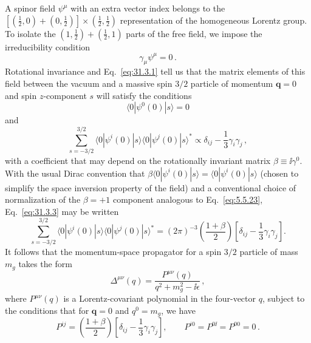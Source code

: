A spinor field \(\psi^\mu\) with an extra vector index belongs to the
\([(\frac12,0)+(0,\frac12)]\mathbin{\times}(\frac12,\frac12)\)
representation of the homogeneous Lorentz group. To isolate the
\((1,\frac12)+(\frac12,1)\) parts of the free field, we impose the
irreducibility condition
\begin{equation}
  \gamma_\mu\psi^\mu=0\,.
  \tag{31.3.1}\label{eq:31.3.1}
\end{equation}
Rotational invariance and Eq.~\eqref{eq:31.3.1} tell us that the matrix
elements of this field between the vacuum and a massive spin \(3/2\)
particle of momentum \(\boldsymbol q=0\) and spin \(z\)-component \(s\)
will satisfy the conditions
\begin{equation}
  \langle0|\psi^0(0)|s\rangle=0
  \tag{31.3.2}\label{eq:31.3.2}
\end{equation}
and
\begin{equation}
  \sum_{s=-3/2}^{3/2}
  \langle0|\psi^i(0)|s\rangle
  \langle0|\psi^j(0)|s\rangle^*
  \propto\delta_{ij}-\frac13\gamma_i\gamma_j\,,
  \tag{31.3.3}\label{eq:31.3.3}
\end{equation}
with a coefficient that may depend on the rotationally invariant matrix
\(\beta\equiv \ii\gamma^0\). With the usual Dirac convention that
\(\beta\langle0|\psi^i(0)|s\rangle=\langle0|\psi^i(0)|s\rangle\)
(chosen to simplify the space inversion property of the field) and a
conventional choice of normalization of the \(\beta=+1\) component
analogous to Eq.~\eqref{eq:5.5.23}, Eq.~\eqref{eq:31.3.3} may be written
\begin{equation}
  \sum_{s=-3/2}^{3/2}
  \langle0|\psi^i(0)|s\rangle
  \langle0|\psi^j(0)|s\rangle^*
  =(2\pi)^{-3}\left(\frac{1+\beta}{2}\right)
  \left[\delta_{ij}-\frac13\gamma_i\gamma_j\right].
  \tag{31.3.4}\label{eq:31.3.4}
\end{equation}
It follows that the momentum-space propagator for a spin \(3/2\) particle
of mass \(m_g\) takes the form
\begin{equation}
  \Delta^{\mu\nu}(q)
  =\frac{P^{\mu\nu}(q)}{q^2+m_g^2-\ii\epsilon}\,,
  \tag{31.3.5}\label{eq:31.3.5}
\end{equation}
where \(P^{\mu\nu}(q)\) is a Lorentz-covariant polynomial in the four-vector
\(q\), subject to the conditions that for \(\boldsymbol q=0\) and
\(q^0=m_g\), we have
\begin{equation}
  P^{ij}
  =\left(\frac{1+\beta}{2}\right)
   \left[\delta_{ij}-\frac13\gamma_i\gamma_j\right],
  \qquad
  P^{i0}=P^{0\ii}=P^{00}=0\,.
  \tag{31.3.6}\label{eq:31.3.6}
\end{equation}
